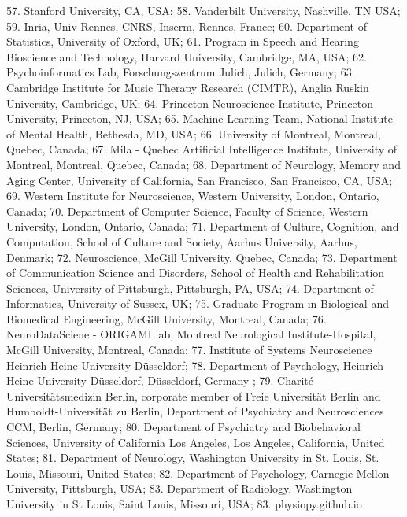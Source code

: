 \documentclass[10pt,a4paper,twocolumns]{proc}
\begin{document}
{57. Stanford University, CA, USA; %
58. Vanderbilt University, Nashville, TN USA; %
59. Inria, Univ Rennes, CNRS, Inserm, Rennes, France; %
60. Department of Statistics, University of Oxford, UK; %
61. Program in Speech and Hearing Bioscience and Technology, Harvard University, Cambridge, MA, USA; %
62. Psychoinformatics Lab, Forschungszentrum Julich, Julich, Germany; %
63. Cambridge Institute for Music Therapy Research (CIMTR), Anglia Ruskin University, Cambridge, UK; %
64. Princeton Neuroscience Institute, Princeton University, Princeton, NJ, USA; %
65. Machine Learning Team, National Institute of Mental Health, Bethesda, MD, USA; %
66. University of Montreal, Montreal, Quebec, Canada; %
67. Mila - Quebec Artificial Intelligence Institute, University of Montreal, Montreal, Quebec, Canada; %
68. Department of Neurology, Memory and Aging Center, University of California, San Francisco, San Francisco, CA, USA; %
69. Western Institute for Neuroscience, Western University, London, Ontario, Canada; %
70. Department of Computer Science, Faculty of Science, Western University, London, Ontario, Canada; %
71. Department of Culture, Cognition, and Computation, School of Culture and Society, Aarhus University, Aarhus, Denmark; %
72. Neuroscience, McGill University, Quebec, Canada; %
73. Department of Communication Science and Disorders, School of Health and Rehabilitation Sciences, University of Pittsburgh, Pittsburgh, PA, USA; %
74. Department of Informatics, University of Sussex, UK; %
75. Graduate Program in Biological and Biomedical Engineering, McGill University, Montreal, Canada; %
76. NeuroDataSciene - ORIGAMI lab, Montreal Neurological Institute-Hospital, McGill University, Montreal, Canada; %
77. Institute of Systems Neuroscience Heinrich Heine University Düsseldorf; %
78. Department of Psychology, Heinrich Heine University Düsseldorf, Düsseldorf, Germany ; %
79. Charité Universitätsmedizin Berlin, corporate member of Freie Universität Berlin and Humboldt-Universität zu Berlin, Department of Psychiatry and Neurosciences CCM, Berlin, Germany; %
80. Department of Psychiatry and Biobehavioral Sciences, University of California Los Angeles, Los Angeles, California, United States; %
81. Department of Neurology, Washington University in St. Louis, St. Louis, Missouri, United States; %
82. Department of Psychology, Carnegie Mellon University, Pittsburgh, USA; %
83. Department of Radiology, Washington University in St Louis, Saint Louis, Missouri, USA; %
83. physiopy.github.io %
}
\\
\end{document}
